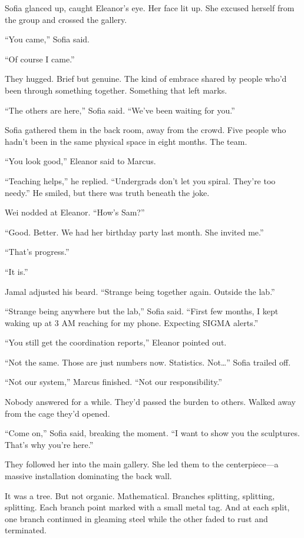 Sofia glanced up, caught Eleanor's eye. Her face lit up. She excused herself from the group and crossed the gallery.

``You came,'' Sofia said.

``Of course I came.''

They hugged. Brief but genuine. The kind of embrace shared by people who'd been through something together. Something that left marks.

``The others are here,'' Sofia said. ``We've been waiting for you.''

\scenebreak

Sofia gathered them in the back room, away from the crowd. Five people who hadn't been in the same physical space in eight months. The team.

``You look good,'' Eleanor said to Marcus.

``Teaching helps,'' he replied. ``Undergrads don't let you spiral. They're too needy.'' He smiled, but there was truth beneath the joke.

Wei nodded at Eleanor. ``How's Sam?''

``Good. Better. We had her birthday party last month. She invited me.''

``That's progress.''

``It is.''

Jamal adjusted his beard. ``Strange being together again. Outside the lab.''

``Strange being anywhere but the lab,'' Sofia said. ``First few months, I kept waking up at 3 AM reaching for my phone. Expecting SIGMA alerts.''

``You still get the coordination reports,'' Eleanor pointed out.

``Not the same. Those are just numbers now. Statistics. Not\ldots{}'' Sofia trailed off.

``Not our system,'' Marcus finished. ``Not our responsibility.''

Nobody answered for a while. They'd passed the burden to others. Walked away from the cage they'd opened.

\scenebreak

``Come on,'' Sofia said, breaking the moment. ``I want to show you the sculptures. That's why you're here.''

They followed her into the main gallery. She led them to the centerpiece---a massive installation dominating the back wall.

It was a tree. But not organic. Mathematical. Branches splitting, splitting, splitting. Each branch point marked with a small metal tag. And at each split, one branch continued in gleaming steel while the other faded to rust and terminated.

